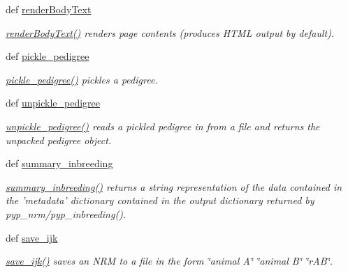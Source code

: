 \begin{CompactItemize}
def \hyperlink{namespacePyPedal_1_1pyp__io_23579dde930ef86ed159126ab4068a46}{render\-Body\-Text}
\begin{CompactList}\small\item\em \hyperlink{namespacePyPedal_1_1pyp__io_23579dde930ef86ed159126ab4068a46}{render\-Body\-Text()} renders page contents (produces HTML output by default). \item\end{CompactList}\item 
def \hyperlink{namespacePyPedal_1_1pyp__io_545a32bfae51807f04ee7138037b1ab8}{pickle\_\-pedigree}
\begin{CompactList}\small\item\em \hyperlink{namespacePyPedal_1_1pyp__io_545a32bfae51807f04ee7138037b1ab8}{pickle\_\-pedigree()} pickles a pedigree. \item\end{CompactList}\item 
def \hyperlink{namespacePyPedal_1_1pyp__io_4a365d51c03b525a0428c653d74d3ee7}{unpickle\_\-pedigree}
\begin{CompactList}\small\item\em \hyperlink{namespacePyPedal_1_1pyp__io_4a365d51c03b525a0428c653d74d3ee7}{unpickle\_\-pedigree()} reads a pickled pedigree in from a file and returns the unpacked pedigree object. \item\end{CompactList}\item 
def \hyperlink{namespacePyPedal_1_1pyp__io_3f2dc00cc32ac2b15474f5dbca14adf5}{summary\_\-inbreeding}
\begin{CompactList}\small\item\em \hyperlink{namespacePyPedal_1_1pyp__io_3f2dc00cc32ac2b15474f5dbca14adf5}{summary\_\-inbreeding()} returns a string representation of the data contained in the 'metadata' dictionary contained in the output dictionary returned by pyp\_\-nrm/pyp\_\-inbreeding(). \item\end{CompactList}\item 
def \hyperlink{namespacePyPedal_1_1pyp__io_a38cc3a00942050095dd82a9f1bc7a29}{save\_\-ijk}
\begin{CompactList}\small\item\em \hyperlink{namespacePyPedal_1_1pyp__io_a38cc3a00942050095dd82a9f1bc7a29}{save\_\-ijk()} saves an NRM to a file in the form \char`\"{}animal A\char`\"{} \char`\"{}animal B\char`\"{} \char`\"{}r\-AB\char`\"{}. \item\end{CompactList}\item 

\end{CompactItemize}

